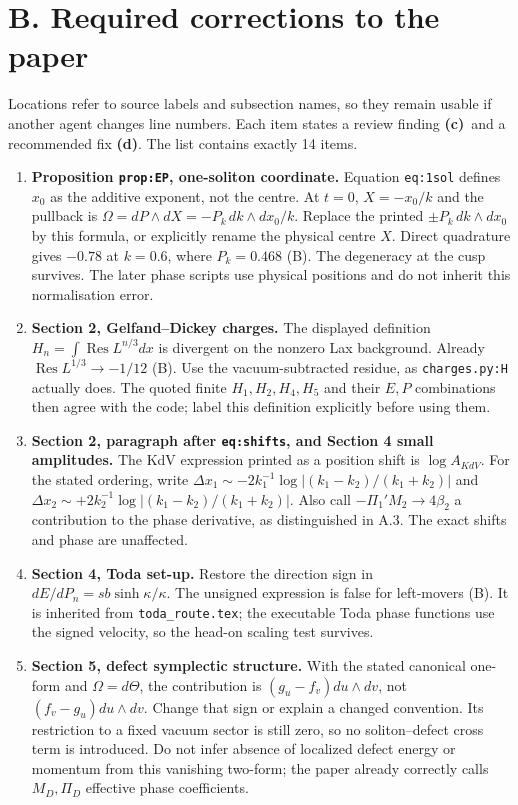 \documentclass[11pt,a4paper]{article}
\newcommand{\C}{\textsf{\textbf{(c)}}}
\newcommand{\D}{\textsf{\textbf{(d)}}}
\newcommand{\file}[1]{\nolinkurl{#1}}
\begin{document}
\section*{B. Required corrections to the paper}
Locations refer to source labels and subsection names, so they remain usable
if another agent changes line numbers. Each item states a review finding
\C\ and a recommended fix \D. The list contains exactly 14 items.
\begin{enumerate}[label=R\arabic*.,leftmargin=*,itemsep=8pt]
\item \textbf{Proposition \file{prop:EP}, one-soliton coordinate.}
Equation \file{eq:1sol} defines $x_0$ as the additive exponent, not the
centre. At $t=0$, $X=-x_0/k$ and the pullback is
$\Omega=dP\wedge dX=-P_k\,dk\wedge dx_0/k$.
Replace the printed $\pm P_k\,dk\wedge dx_0$ by this formula, or explicitly
rename the physical centre $X$. Direct quadrature gives $-0.78$ at $k=0.6$,
where $P_k=0.468$ (B). The degeneracy at the cusp survives.
The later phase scripts use physical positions and do not inherit this
normalisation error.

\item \textbf{Section 2, Gelfand--Dickey charges.}
The displayed definition $H_n=\int\operatorname{Res}L^{n/3}dx$ is divergent
on the nonzero Lax background. Already
$\operatorname{Res}L^{1/3}\to-1/12$ (B).
Use the vacuum-subtracted residue, as \file{charges.py:H} actually does.
The quoted finite $H_1,H_2,H_4,H_5$ and their $E,P$ combinations then agree
with the code; label this definition explicitly before using them.

\item \textbf{Section 2, paragraph after \file{eq:shifts}, and Section 4
small amplitudes.}
The KdV expression printed as a position shift is $\log A_{KdV}$.
For the stated ordering, write
$\Delta x_1\sim-2k_1^{-1}\log|(k_1-k_2)/(k_1+k_2)|$ and
$\Delta x_2\sim+2k_2^{-1}\log|(k_1-k_2)/(k_1+k_2)|$.
Also call $-\Pi_1'M_2\to4\beta_2$ a contribution to the phase derivative,
as distinguished in A.3. The exact shifts and phase are unaffected.

\item \textbf{Section 4, Toda set-up.}
Restore the direction sign in $dE/dP_n=s b\sinh\kappa/\kappa$.
The unsigned expression is false for left-movers (B).
It is inherited from \file{toda_route.tex}; the executable Toda phase
functions use the signed velocity, so the head-on scaling test survives.

\item \textbf{Section 5, defect symplectic structure.}
With the stated canonical one-form and $\Omega=d\Theta$, the contribution
is $(g_u-f_v)du\wedge dv$, not $(f_v-g_u)du\wedge dv$.
Change that sign or explain a changed convention. Its restriction to a fixed
vacuum sector is still zero, so no soliton--defect cross term is introduced.
Do not infer absence of localized defect energy or momentum from this
vanishing two-form; the paper already correctly calls $M_D,\Pi_D$ effective
phase coefficients.


\end{enumerate}
\end{document}

